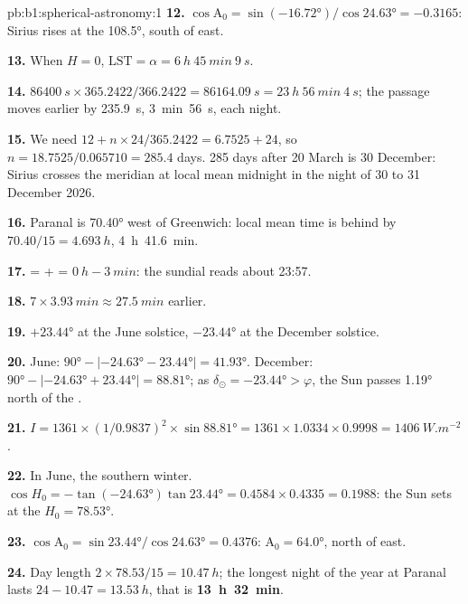 \begin{solution}{pb:b1:spherical-astronomy:1}
\textbf{12.} $\cos\mathrm{A}_0 = \sin(\ang{-16.72})/\cos\ang{24.63} =
-0.3165$: Sirius rises at the  \ang{108.5}, south of east.

\textbf{13.} When $H = 0$, $\mathrm{LST} = \alpha = \qty{6}{h}~\qty{45}{min}~\qty{9}{s}$.

\textbf{14.} $\qty{86400}{s}\times365.2422/366.2422 = \qty{86164.09}{s} =
\qty{23}{h}~\qty{56}{min}~\qty{4}{s}$; the passage moves earlier by
\qty{235.9}{s}, \qty{3}{min}~\qty{56}{s}, each night.

\textbf{15.} We need $12 + n\times24/365.2422 = 6.7525 + 24$, so
$n = 18.7525/0.065710 = 285.4$ days. 285 days after 20 March is
30 December: Sirius crosses the meridian at local mean midnight in the night
of 30 to 31 December 2026.

\textbf{16.} Paranal is \ang{70.40} west of Greenwich: local mean time is
behind by $70.40/15 = \qty{4.693}{h}$, \qty{4}{h}~\qty{41.6}{min}.

\textbf{17.}  =  +  =
$\qty{0}{h} - \qty{3}{min}$: the sundial reads about 23:57.

\textbf{18.} $7\times\qty{3.93}{min} \approx \qty{27.5}{min}$ earlier.

\textbf{19.} $+\ang{23.44}$ at the June solstice, $-\ang{23.44}$ at the
December solstice.

\textbf{20.} June: $\ang{90} - |\ang{-24.63} - \ang{23.44}| = \ang{41.93}$.
December: $\ang{90} - |\ang{-24.63} + \ang{23.44}| = \ang{88.81}$; as
$\delta_\odot = \ang{-23.44} > \varphi$, the Sun passes \ang{1.19} north of the
.

\textbf{21.} $I = 1361\times(1/0.9837)^2\times\sin\ang{88.81} = 1361\times
1.0334\times0.9998 = \qty{1406}{W.m^{-2}}$.

\textbf{22.} In June, the southern winter. $\cos H_0 = -\tan(\ang{-24.63})
\tan\ang{23.44} = 0.4584\times0.4335 = 0.1988$: the Sun sets at the 
$H_0 = \ang{78.53}$.

\textbf{23.} $\cos\mathrm{A}_0 = \sin\ang{23.44}/\cos\ang{24.63} = 0.4376$:
$\mathrm{A}_0 = \ang{64.0}$, north of east.

\textbf{24.} Day length $2\times78.53/15 = \qty{10.47}{h}$; the longest night
of the year at Paranal lasts $24 - 10.47 = \qty{13.53}{h}$, that is
\textbf{\qty[text-series-to-math=true]{13}{h}~\qty[text-series-to-math=true]{32}{min}}.
\end{solution}
